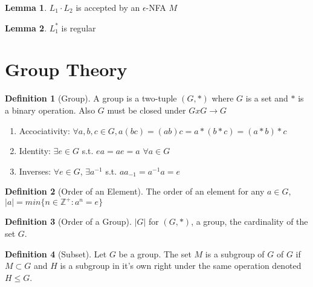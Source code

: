 \documentclass{article}
\theoremstyle{definition}
\newtheorem{define}{Definition}[section]
\newtheorem{lem}{Lemma}[section]
\begin{document}
\begin{lem}
$L_1\cdot L_2$ is accepted by an $\epsilon$-NFA $M$
\end{lem}

\begin{lem}
$L_1^*$ is regular
\end{lem}

\section{Group Theory}

\begin{define}[Group]
A group is a two-tuple $(G,*)$ where $G$ is a set and $*$ is a binary operation. Also $G$ must be closed under $GxG\rightarrow G$
	\begin{enumerate}
		\item Accociativity: $\forall a,b,c \in G, a(bc) = (ab)c=a*(b*c)=(a*b)*c$
		\item Identity: $\exists e \in G$ s.t. $ea=ae=a$ $\forall a \in G$
		\item Inverses: $\forall e \in G$, $\exists a^{-1}$ s.t. $aa_{-1}= a^{-1}a =e$
	\end{enumerate}
\end{define} 

\begin{define}[Order of an Element]
The order of an element for any $a \in G$, $|a| = min\{n\in \mathbb{Z}^+: a^n=e\}$
\end{define}

\begin{define}[Order of a Group]
$|G|$ for $(G,*)$, a group, the cardinality of the set $G$.
\end{define}

\begin{define}[Subset]
Let $G$ be a group. The set $M$ is a subgroup of $G$ of $G$ if $M\subset G$ and $H$ is a subgroup in it's own right under the same operation denoted $H \leq G$.
\end{define}
\end{document}
